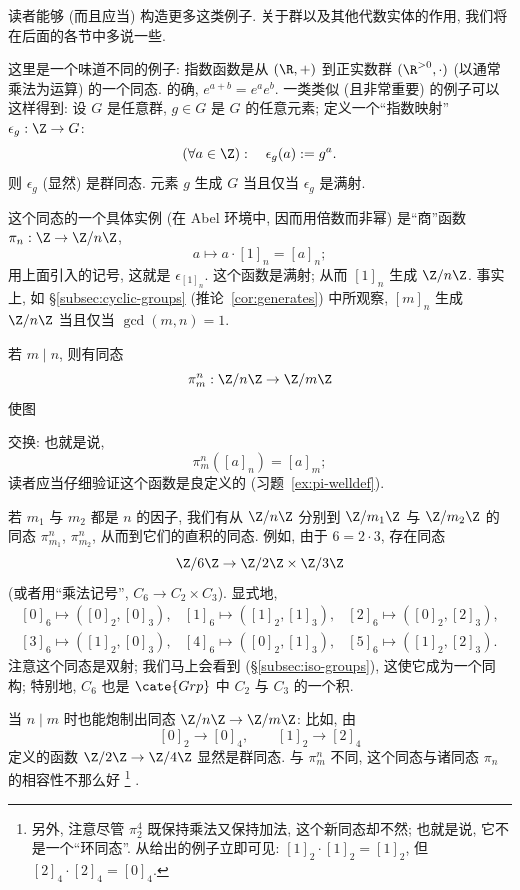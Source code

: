 读者能够 (而且应当) 构造更多这类例子. 关于群以及其他代数实体的作用, 我们将在后面的各节中多说一些.

这里是一个味道不同的例子: 指数函数是从 $(\R, +)$ 到正实数群 $(\R^{>0}, \cdot)$ (以通常乘法为运算) 的一个同态. 的确, $e^{a+b} = e^a e^b$. 一类类似 (且非常重要) 的例子可以这样得到: 设 $G$ 是任意群, $g \in G$ 是 $G$ 的任意元素; 定义一个``指数映射''$\epsilon_g : \Z \to G$:
\[
(\forall a \in \Z): \quad \epsilon_g(a) := g^a.
\]
则 $\epsilon_g$ (显然) 是群同态. 元素 $g$ 生成 $G$ 当且仅当 $\epsilon_g$ 是满射.

这个同态的一个具体实例 (在 Abel 环境中, 因而用倍数而非幂) 是``商''函数 $\pi_n : \Z \to \Z/n\Z$,
\[
a \mapsto a \cdot [1]_n = [a]_n;
\]
用上面引入的记号, 这就是 $\epsilon_{[1]_n}$. 这个函数是满射; 从而 $[1]_n$ 生成 $\Z/n\Z$. 事实上, 如 \S\ref{subsec:cyclic-groups} (推论~\ref{cor:generates}) 中所观察, $[m]_n$ 生成 $\Z/n\Z$ 当且仅当 $\gcd(m,n) = 1$.

若 $m \mid n$, 则有同态
\[
\pi_m^n : \Z/n\Z \to \Z/m\Z
\]
使图
\begin{center}
\end{center}
交换: 也就是说,
\[
\pi_m^n([a]_n) = [a]_m;
\]
读者应当仔细验证这个函数是良定义的 (习题~\ref{ex:pi-welldef}).

若 $m_1$ 与 $m_2$ 都是 $n$ 的因子, 我们有从 $\Z/n\Z$ 分别到 $\Z/m_1\Z$ 与 $\Z/m_2\Z$ 的同态 $\pi_{m_1}^n$, $\pi_{m_2}^n$, 从而到它们的直积的同态. 例如, 由于 $6 = 2 \cdot 3$, 存在同态
\[
\Z/6\Z \to \Z/2\Z \times \Z/3\Z
\]
(或者用``乘法记号'', $C_6 \to C_2 \times C_3$). 显式地,
\[
\begin{array}{lll}
{[0]_6 \mapsto ([0]_2, [0]_3)}, & [1]_6 \mapsto ([1]_2, [1]_3), & [2]_6 \mapsto ([0]_2, [2]_3), \\
{[3]_6 \mapsto ([1]_2, [0]_3)}, & [4]_6 \mapsto ([0]_2, [1]_3), & [5]_6 \mapsto ([1]_2, [2]_3).
\end{array}
\]
注意这个同态是双射; 我们马上会看到 (\S\ref{subsec:iso-groups}), 这使它成为一个同构; 特别地, $C_6$ 也是 $\cate{Grp}$ 中 $C_2$ 与 $C_3$ 的一个积.

当 $n \mid m$ 时也能炮制出同态 $\Z/n\Z \to \Z/m\Z$: 比如, 由
\[
[0]_2 \rightarrow [0]_4, \qquad [1]_2 \rightarrow [2]_4
\]
定义的函数 $\Z/2\Z \to \Z/4\Z$ 显然是群同态. 与 $\pi_m^n$ 不同, 这个同态与诸同态 $\pi_n$ 的相容性不那么好%
\footnote{另外, 注意尽管 $\pi_2^4$ 既保持乘法又保持加法, 这个新同态却不然; 也就是说, 它不是一个``环同态''. 从给出的例子立即可见: $[1]_2 \cdot [1]_2 = [1]_2$, 但 $[2]_4 \cdot [2]_4 = [0]_4$.}%
.

